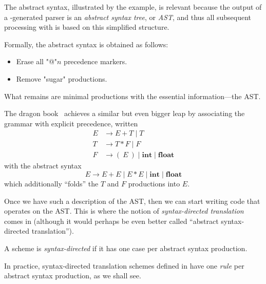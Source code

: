 \documentclass[11pt]{article} %
\begin{document}
The abstract syntax, illustrated by the example, is relevant because the output of a \HAX-generated
parser is an \emph{abstract syntax tree}, or \emph{AST}, and thus all subsequent processing with
\HAX is based on this simplified structure.

Formally, the abstract syntax is obtained as follows:
\begin{itemize}
\item Erase all "@"$n$ precedence markers.
\item Remove "sugar" productions.
\end{itemize}
What remains are minimal productions with the essential information---the AST.

{\small\begin{remark}%
    The dragon book~\cite{Aho+:2006} achieves a similar but even bigger leap by associating the
    grammar with explicit precedence, written
    \begin{align*}
      E &→ E+T \mid T \\
      T &→ T*F \mid F \\
      F &→ (~E~) \mid \textbf{int} \mid \textbf{float}
    \end{align*}
    with the abstract syntax
    \begin{displaymath}
      E → E+E \mid E*E \mid \textbf{int} \mid \textbf{float}
    \end{displaymath}
    which additionally ``folds'' the $T$ and $F$ productions into $E$.
  \end{remark}}

Once we have such a description of the AST, then we can start writing code that operates on the
AST. This is where the notion of \emph{syntax-directed translation} comes in (although it would
perhaps be even better called ``abstract syntax-directed translation'').

\begin{definition}
  A scheme is \emph{syntax-directed} if it has one case per abstract syntax production.
\end{definition}

In practice, syntax-directed translation schemes defined in \HAX have one \emph{rule} per abstract
syntax production, as we shall see.
\end{document}
